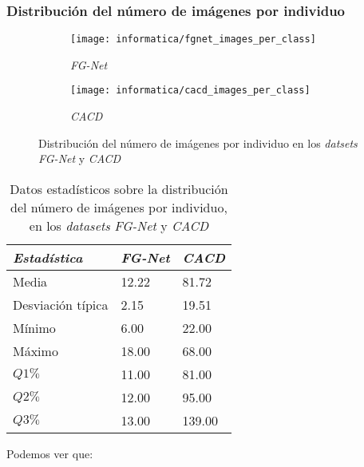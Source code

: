 \subsubsection{Distribución del número de imágenes por individuo}

\begin{figure}[H]
\centering
    \begin{subfigure}{.5\textwidth}
        \centering
        \texttt{[image: informatica/fgnet\_images\_per\_class]}
        \caption{\textit{FG-Net}}
    \end{subfigure}%
    \begin{subfigure}{.5\textwidth}
        \centering
        \texttt{[image: informatica/cacd\_images\_per\_class]}
        \caption{\textit{CACD}}
    \end{subfigure}
\caption{Distribución del número de imágenes por individuo en los \textit{datsets} \textit{FG-Net} y \textit{CACD} }
\end{figure}


\begin{table}[H]
\centering
\begin{tabular}{|l|l|l|}
    \hline
    \textbf{\textit{Estadística}} & \textbf{\textit{FG-Net}} & \textbf{\textit{CACD}} \\
    \hline

    Media             & 12.22 & 81.72  \\
    Desviación típica & 2.15  & 19.51  \\
    Mínimo            & 6.00  & 22.00  \\
    Máximo            & 18.00 & 68.00  \\
    $Q1 \%$           & 11.00 & 81.00  \\
    $Q2 \%$           & 12.00 & 95.00  \\
    $Q3 \%$           & 13.00 & 139.00 \\

    \hline

\end{tabular}
\caption{Datos estadísticos sobre la distribución del número de imágenes por individuo, en los \textit{datasets} \textit{FG-Net} y \textit{CACD}}
\end{table}

Podemos ver que:

